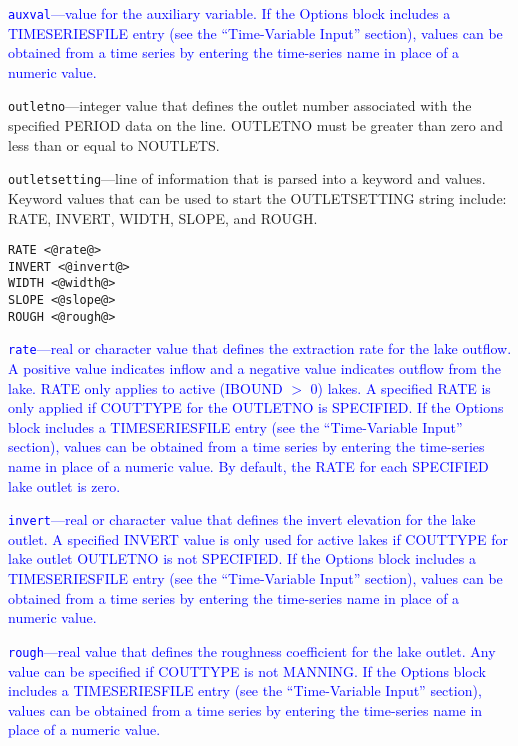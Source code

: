\begin{description}
\item \textcolor{blue}{\texttt{auxval}---value for the auxiliary variable. If the Options block includes a TIMESERIESFILE entry (see the ``Time-Variable Input'' section), values can be obtained from a time series by entering the time-series name in place of a numeric value.}

\item \texttt{outletno}---integer value that defines the outlet number associated with the specified PERIOD data on the line. OUTLETNO must be greater than zero and less than or equal to NOUTLETS.

\item \texttt{outletsetting}---line of information that is parsed into a keyword and values.  Keyword values that can be used to start the OUTLETSETTING string include: RATE, INVERT, WIDTH, SLOPE, and ROUGH.

\begin{lstlisting}[style=blockdefinition]
RATE <@rate@>
INVERT <@invert@>
WIDTH <@width@>
SLOPE <@slope@>
ROUGH <@rough@>
\end{lstlisting}

\item \textcolor{blue}{\texttt{rate}---real or character value that defines the extraction rate for the lake outflow. A positive value indicates inflow and a negative value indicates outflow from the lake. RATE only applies to active (IBOUND $>$ 0) lakes. A specified RATE is only applied if COUTTYPE for the OUTLETNO is SPECIFIED. If the Options block includes a TIMESERIESFILE entry (see the ``Time-Variable Input'' section), values can be obtained from a time series by entering the time-series name in place of a numeric value. By default, the RATE for each SPECIFIED lake outlet is zero.}

\item \textcolor{blue}{\texttt{invert}---real or character value that defines the invert elevation for the lake outlet. A specified INVERT value is only used for active lakes if COUTTYPE for lake outlet OUTLETNO is not SPECIFIED. If the Options block includes a TIMESERIESFILE entry (see the ``Time-Variable Input'' section), values can be obtained from a time series by entering the time-series name in place of a numeric value.}

\item \textcolor{blue}{\texttt{rough}---real value that defines the roughness coefficient for the lake outlet. Any value can be specified if COUTTYPE is not MANNING. If the Options block includes a TIMESERIESFILE entry (see the ``Time-Variable Input'' section), values can be obtained from a time series by entering the time-series name in place of a numeric value.}


\end{description}
